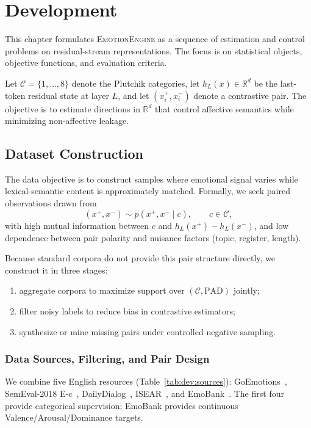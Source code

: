 %

\chapter{Development}
\label{chap:development}

This chapter formulates \textsc{EmotionEngine} as a sequence of
estimation and control problems on residual-stream representations. The
focus is on statistical objects, objective functions, and evaluation
criteria.

Let $\mathcal{C}=\{1,\dots,8\}$ denote the Plutchik categories, let
$h_L(x)\in\mathbb{R}^{d}$ be the last-token residual state at layer $L$,
and let $(x_i^+,x_i^-)$ denote a contrastive pair. The objective is to
estimate directions in $\mathbb{R}^{d}$ that control affective semantics
while minimizing non-affective leakage.

\section{Dataset Construction}

The data objective is to construct samples where emotional signal varies
while lexical-semantic content is approximately matched. Formally, we
seek paired observations drawn from
\begin{equation}
  (x^+,x^-) \sim p(x^+,x^-\mid c),\qquad c\in\mathcal{C},
\end{equation}
with high mutual information between $c$ and
$h_L(x^+)-h_L(x^-)$, and low dependence between pair polarity and
nuisance factors (topic, register, length).

Because standard corpora do not provide this pair structure directly, we
construct it in three stages:
\begin{enumerate}
  \item aggregate corpora to maximize support over
    $(\mathcal{C},\mathrm{PAD})$ jointly;
  \item filter noisy labels to reduce bias in contrastive estimators;
  \item synthesize or mine missing pairs under controlled negative
    sampling.
\end{enumerate}

\subsection{Data Sources, Filtering, and Pair Design}
\label{sec:dev:data:sources}
We combine five English resources (Table~\ref{tab:dev:sources}):
GoEmotions~\cite{demszky2020goemotionsdatasetfinegrainedemotions},
SemEval-2018 E-c~\cite{mohammad2018semeval},
DailyDialog~\cite{li2017dailydialogmanuallylabelledmultiturn},
ISEAR~\cite{scherer1990isear}, and
EmoBank~\cite{buechel2022emobankstudyingimpactannotation}. The first four
provide categorical supervision; EmoBank provides continuous
Valence/Arousal/Dominance targets.


